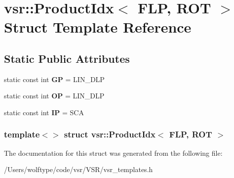 \hypertarget{structvsr_1_1_product_idx_3_01_f_l_p_00_01_r_o_t_01_4}{\section{vsr\-:\-:Product\-Idx$<$ F\-L\-P, R\-O\-T $>$ Struct Template Reference}
\label{structvsr_1_1_product_idx_3_01_f_l_p_00_01_r_o_t_01_4}
}
\subsection*{Static Public Attributes}
\begin{DoxyCompactItemize}
\item 
\hypertarget{structvsr_1_1_product_idx_3_01_f_l_p_00_01_r_o_t_01_4_a31106acc4f56707c603e4b44251e8bf1}{static const int {\bfseries G\-P} = L\-I\-N\-\_\-\-D\-L\-P}\label{structvsr_1_1_product_idx_3_01_f_l_p_00_01_r_o_t_01_4_a31106acc4f56707c603e4b44251e8bf1}

\item 
\hypertarget{structvsr_1_1_product_idx_3_01_f_l_p_00_01_r_o_t_01_4_accfd33b97b4c24bd5cb872dd08b1747f}{static const int {\bfseries O\-P} = L\-I\-N\-\_\-\-D\-L\-P}\label{structvsr_1_1_product_idx_3_01_f_l_p_00_01_r_o_t_01_4_accfd33b97b4c24bd5cb872dd08b1747f}

\item 
\hypertarget{structvsr_1_1_product_idx_3_01_f_l_p_00_01_r_o_t_01_4_ae03d9f23a97c277d067cda9a2003d089}{static const int {\bfseries I\-P} = S\-C\-A}\label{structvsr_1_1_product_idx_3_01_f_l_p_00_01_r_o_t_01_4_ae03d9f23a97c277d067cda9a2003d089}

\end{DoxyCompactItemize}
\subsubsection*{template$<$$>$ struct vsr\-::\-Product\-Idx$<$ F\-L\-P, R\-O\-T $>$}



The documentation for this struct was generated from the following file\-:\begin{DoxyCompactItemize}
\item 
/\-Users/wolftype/code/vsr/\-V\-S\-R/vsr\-\_\-templates.\-h\end{DoxyCompactItemize}
